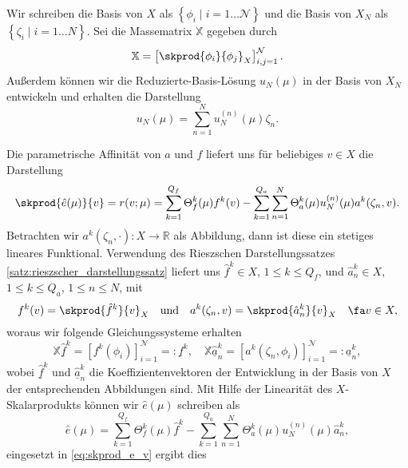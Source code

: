 Wir schreiben die Basis von $X$ als $\left\{ \phi_i \mid i = 1 \ldots \mathcal N \right\}$ und die Basis von $X_N$ als $\left\{ \zeta_i \mid i = 1 \ldots N \right\}$.
Sei die Massematrix $\mathbb{X}$ gegeben durch
\begin{equation}
    \mathbb{X} = \left[ \skprod{\phi_i}{\phi_j}_X \right]_{i,j=1}^{\mathcal N}.
\end{equation}
Außerdem können wir die Reduzierte-Basis-Lösung $u_N(\mu)$ in der Basis von $X_N$ entwickeln und erhalten die Darstellung
\begin{equation}
    u_N(\mu) = \sum_{n=1}^{N} u_N^{(n)}(\mu) \zeta_n.
\end{equation}

Die parametrische Affinität von $a$ und $f$ liefert uns für beliebiges $v \in X$ die Darstellung
\begin{equation}
    \label{eq:skprod_e_v}
    \skprod{\hat e(\mu)}{v} = r(v; \mu) = \sum_{k=1}^{Q_f} \Theta_f^k(\mu) f^k(v) - \sum_{k=1}^{Q_a} \sum_{n=1}^{N} \Theta_a^k(\mu) u_N^{(n)}(\mu)a^k(\zeta_n, v).
\end{equation}
Betrachten wir $a^k(\zeta_n, \cdot) \colon X \to \mathbb{R}$ als Abbildung, dann ist diese ein stetiges lineares Funktional. Verwendung des Rieszschen Darstellungssatzes \ref{satz:rieszscher_darstellungssatz} liefert uns $\hat f^k \in X$, $1 \leq k \leq Q_f$, und $\hat a^k_n \in X$, $1 \leq k \leq Q_a$, $1 \leq n \leq N$, mit
\begin{equation}
    f^k(v) = \skprod{\hat f^k}{v}_X \quad\text{und}\quad a^k(\zeta_n, v) = \skprod{\hat a^k_n}{v}_X \quad \fa v \in X,
\end{equation}
woraus wir folgende Gleichungssysteme erhalten
\begin{equation}
    \label{eq:Xf_eq_f_and_Xa_eq_a}
    \mathbb{X} \underline{\hat{f}}^k = [f^k(\phi_i)]_{i=1}^{\mathcal N} =: \underline f^k, \quad \mathbb{X} \underline{\hat{a}}^k_n = [a^k(\zeta_n, \phi_i)]_{i=1}^{\mathcal N} =: \underline a^k_n,
\end{equation}
wobei $\underline{\hat{f}}^k$ und $\underline{\hat{a}}^k_n$ die Koeffizientenvektoren der Entwicklung in der Basis von $X$ der entsprechenden Abbildungen sind.
Mit Hilfe der Linearität des $X$-Skalarprodukts können wir $\hat e(\mu)$ schreiben als
\begin{equation}
    \hat e(\mu) = \sum_{k=1}^{Q_f} \Theta_f^k(\mu) \hat f^k - \sum_{k=1}^{Q_a} \sum_{n=1}^{N} \Theta_a^k(\mu) u_N^{(n)}(\mu) \hat a^k_n,
\end{equation}
eingesetzt in \eqref{eq:skprod_e_v} ergibt dies
